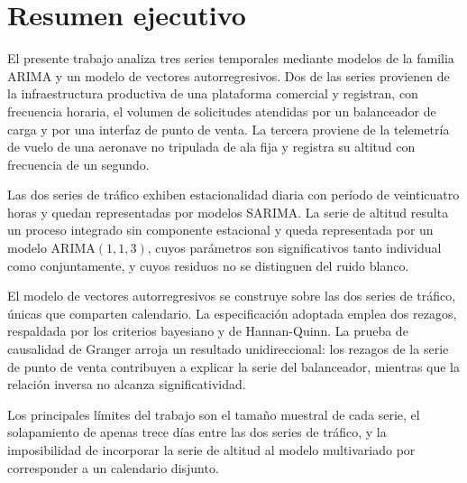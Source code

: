 \section*{Resumen ejecutivo}

El presente trabajo analiza tres series temporales mediante modelos de la familia ARIMA y
un modelo de vectores autorregresivos. Dos de las series provienen de la infraestructura
productiva de una plataforma comercial y registran, con frecuencia horaria, el volumen de
solicitudes atendidas por un balanceador de carga y por una interfaz de punto de venta. La
tercera proviene de la telemetría de vuelo de una aeronave no tripulada de ala fija y
registra su altitud con frecuencia de un segundo.

Las dos series de tráfico exhiben estacionalidad diaria con período de veinticuatro horas y
quedan representadas por modelos SARIMA. La serie de altitud resulta un proceso integrado sin
componente estacional y queda representada por un modelo ARIMA$(1,1,3)$, cuyos parámetros son
significativos tanto individual como conjuntamente, y cuyos residuos no se distinguen del
ruido blanco.

El modelo de vectores autorregresivos se construye sobre las dos series de tráfico, únicas que
comparten calendario. La especificación adoptada emplea dos rezagos, respaldada por los
criterios bayesiano y de Hannan-Quinn. La prueba de causalidad de Granger arroja un resultado
unidireccional: los rezagos de la serie de punto de venta contribuyen a explicar la serie del
balanceador, mientras que la relación inversa no alcanza significatividad.

Los principales límites del trabajo son el tamaño muestral de cada serie, el solapamiento de
apenas trece días entre las dos series de tráfico, y la imposibilidad de incorporar la serie
de altitud al modelo multivariado por corresponder a un calendario disjunto.
